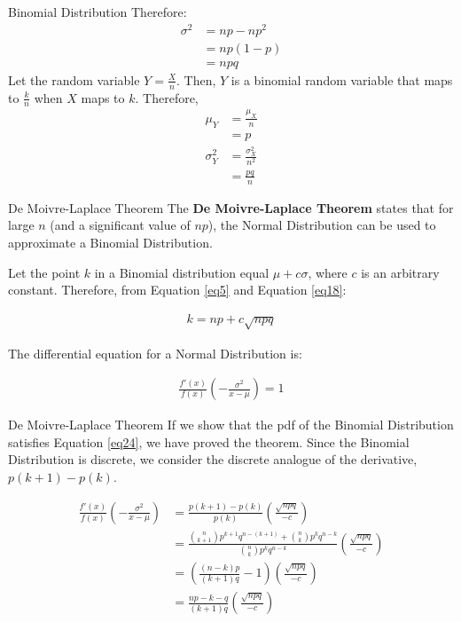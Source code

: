 \documentclass{beamer}
\providecommand{\brak}[1]{\ensuremath{\left(#1\right)}}
\begin{document}
\begin{frame}{Binomial Distribution}
Therefore:
    \begin{align}
        \sigma^2 &= np-np^2 \\
        &= np(1-p) \\
        \label{eq18}
        &= npq
    \end{align}
Let the random variable $Y = \frac{X}{n}$. Then, $Y$ is a binomial random variable that maps to $\frac{k}{n}$ when $X$ maps to $k$. Therefore, 
\begin{align}
        \mu_Y &= \frac{\mu_X}{n} \\
        &= p \\
        \sigma^2_Y &= \frac{\sigma^2_X}{n^2} \\
           &= \frac{pq}{n}
    \end{align}
\end{frame}


\begin{frame}{De Moivre-Laplace Theorem}
    The \textbf{De Moivre-Laplace Theorem} states that for large $n$ (and a significant value of $np$), the Normal Distribution can be used to approximate a Binomial Distribution.
    
    Let the point $k$ in a Binomial distribution equal $\mu + c\sigma$, where $c$ is an arbitrary constant. Therefore, from Equation \ref{eq5} and Equation \ref{eq18}:
    
    \begin{align}
        k = np + c \sqrt{npq}
    \end{align}
    
    The differential equation for a Normal Distribution is:
    
    \begin{align}
        \label{eq24}
        \frac{f'(x)}{f(x)} \brak{-\frac{\sigma^2}{x-\mu}} = 1
    \end{align}
    
    
\end{frame}

\begin{frame}{De Moivre-Laplace Theorem}
    If we show that the pdf of the Binomial Distribution satisfies Equation \ref{eq24}, we have proved the theorem.
    Since the Binomial Distribution is discrete, we consider the discrete analogue of the derivative, $p(k+1)-p(k)$.
    
    \begin{align}
          \frac{f'(x)}{f(x)} \brak{-\frac{\sigma^2}{x-\mu}} &=   \frac{p(k+1)-p(k)}{p(k)} \brak{\frac{\sqrt{npq}}{-c}} \\
          &= \frac{\binom{n}{k+1}p^{k+1}q^{n-(k+1)} + \binom{n}{k}p^{k}q^{n-k} }{\binom{n}{k}p^{k}q^{n-k}}  \brak{\frac{\sqrt{npq}}{-c}} \\
          &= \brak{\frac{(n-k)p}{(k+1)q}-1}\brak{\frac{\sqrt{npq}}{-c}} \\ 
          &= \frac{np-k-q}{(k+1)q}\brak{\frac{\sqrt{npq}}{-c}}
    \end{align}
    

\end{frame}
\end{document}
